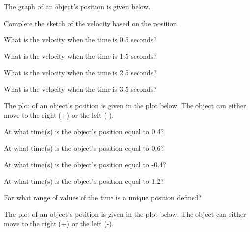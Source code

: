 \begin{problem}

\item The graph of an object's position is given below. 

  \begin{subproblem}
  \item Complete the sketch of the velocity based on the position.

    \scalebox{0.8}{}

    \item What is the velocity when the time is 0.5 seconds?
      \vspace{3em}

    \item What is the velocity when the time is 1.5 seconds?
      \vspace{3em}

    \item What is the velocity when the time is 2.5  seconds?
      \vspace{3em}

    \item What is the velocity when the time is 3.5 seconds?
      \vspace{3em}

    \clearpage

  \item The plot of an object's position is given in the plot
    below. The object can either move to the right (+) or the left
    (-).

    \scalebox{0.4}{}

    \begin{subproblem}
    \item At what time(s) is the object's position equal to 0.4?
      \vfill
    \item At what time(s) is the object's position equal to 0.6?
      \vfill
    \item At what time(s) is the object's position equal to -0.4?
      \vfill
    \item At what time(s) is the object's position equal to 1.2?
      \vfill
    \item For what range of values of the time is a unique position
      defined?  
      \vfill
    \end{subproblem}

    \clearpage

  \item The plot of an object's position is given in the plot
    below. The object can either move to the right (+) or the left
    (-).


\end{subproblem}
\end{problem}
